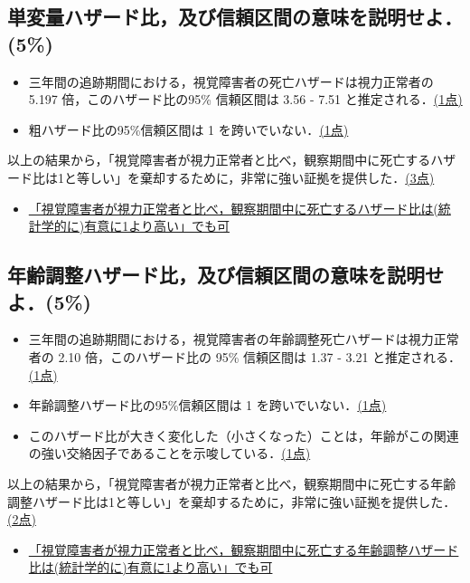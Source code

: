\documentclass[11pt,]{problemset}
\begin{document}
\hypertarget{5}{%
\subsection{単変量ハザード比，及び信頼区間の意味を説明せよ．(5\%)}\label{5}}

\begin{itemize}
\item
  三年間の追跡期間における，視覚障害者の死亡ハザードは視力正常者の 5.197
  倍，このハザード比の95\% 信頼区間は 3.56 - 7.51
  と推定される．\underline{(1点)}
\item
  粗ハザード比の95\%信頼区間は 1 を跨いでいない．\underline{(1点)}
\end{itemize}

以上の結果から，「視覚障害者が視力正常者と比べ，観察期間中に死亡するハザード比は1と等しい」を棄却するために，非常に強い証拠を提供した．\underline{(3点)}

\begin{itemize}
\item
  \underline{「視覚障害者が視力正常者と比べ，観察期間中に死亡するハザード比は(統計学的に)}\newline\underline{有意に1より高い」でも可}
\end{itemize}

\hypertarget{5}{%
\subsection{年齢調整ハザード比，及び信頼区間の意味を説明せよ．(5\%)}\label{5}}

\begin{itemize}
\item
  三年間の追跡期間における，視覚障害者の年齢調整死亡ハザードは視力正常者の
  2.10 倍，このハザード比の 95\% 信頼区間は 1.37 - 3.21
  と推定される．\underline{(1点)}
\item
  年齢調整ハザード比の95\%信頼区間は 1 を跨いでいない．\underline{(1点)}
\item
  このハザード比が大きく変化した（小さくなった）ことは，年齢がこの関連の強い交絡因子であることを示唆している．\underline{(1点)}
\end{itemize}

以上の結果から，「視覚障害者が視力正常者と比べ，観察期間中に死亡する年齢調整ハザード比は1と等しい」を棄却するために，非常に強い証拠を提供した．\underline{(2点)}

\begin{itemize}
\item
  \underline{「視覚障害者が視力正常者と比べ，観察期間中に死亡する年齢調整ハザード比は}\newline\underline{(統計学的に)有意に1より高い」でも可}
\end{itemize}
\end{document}
